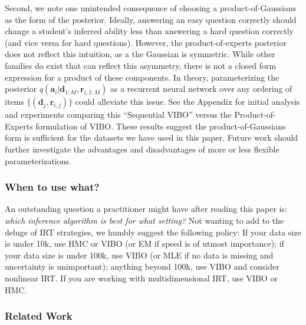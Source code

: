 Second, we note one unintended consequence of choosing a product-of-Gaussians as the form of the posterior.
Ideally, answering an easy question correctly should change a student's inferred ability less than answering a hard question correctly (and vice versa for hard questions).
However, the product-of-experts posterior does not reflect this intuition, as a the Gaussian is symmetric. 
While other families do exist that can reflect this asymmetry, there is not a closed form expression for a product of these components.
In theory, parameterizing the posterior $q(\textbf{a}_i|\textbf{d}_{1:M}, \textbf{r}_{i,1:M})$ as a recurrent neural network over any ordering of items $\{(\textbf{d}_j, \textbf{r}_{i,j})\}$ could alleviate this issue. 
See the Appendix for initial analysis and experiments comparing this ``Sequential VIBO'' versus the Product-of-Experts formulation of VIBO. 
These results suggest the product-of-Gaussians form is sufficient for the datasets we have used in this paper.
Future work should further investigate the advantages and disadvantages of more or less flexible parameterizations.

\subsubsection{When to use what?}
An outstanding question a practitioner might have after reading this paper is: \textit{which inference algorithm is best for what setting?}
Not wanting to add to the deluge of IRT strategies, we humbly suggest the following policy: If your data size is under 10k, use HMC or VIBO (or EM if speed is of utmost importance); if your data size is under 100k, use VIBO (or MLE if no data is missing and uncertainty is unimportant); anything beyond 100k, use VIBO and consider nonlinear IRT.
If you are working with multidimensional IRT, use VIBO or HMC. 

\subsubsection{Related Work}
\label{sec:related}

